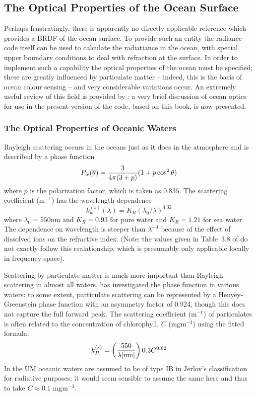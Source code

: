 \subsection{The Optical Properties of the Ocean Surface}

Perhaps frustratingly, there is apparently no directly applicable reference
which provides a BRDF of the ocean surface. To provide such an entity the
radiance code itself can be used to calculate the radiatiance in the
ocean, with special upper boundary conditions to deal with refraction at
the surface. In order to implement such a capability the optical properties
of the ocean must be specified; these are greatly influenced by particulate
matter -- indeed, this is the basis of ocean colour sensing -- and very
considerable variations occur. An extremely useful review of this
field is provided by \cite{Mobley94}: a very brief discussion of ocean
optics for use in the present version of the code,  based on this book, 
is now presented.

\subsubsection{The Optical Properties of Oceanic Waters}

Rayleigh scattering occurs in the oceans just as it does in the atmosphere
and is described by a phase function
\begin{equation}
P_w(\theta) = {3\over {4\pi (3+p)}} (1+p\cos^2 \theta)
\end{equation}
where $p$ is the polarization factor, which is taken as $0.835$. The scattering
coefficient (m${}^{-1}$) has the wavelength dependence
\begin{equation}
k_w^{(s)}(\lambda) = K_R (\lambda_0/\lambda)^{4.32}
\end{equation}
where $\lambda_0=550$nm and $K_R=0.93$ for pure water and $K_R=1.21$ for
sea water. The dependence on wavelength is steeper than $\lambda^{-4}$ 
because of the effect of dissolved ions on the refractive index. (Note: the
values given in Table~3.8 of \cite{Mobley94} do not exactly follow this
realationship, which is presumably only applicable locally in frequency
space). 

Scattering by particulate matter is much more important than Rayleigh
scattering in almost all waters. \cite{Petzold72} has investigated the
phase function in various waters: to some extent, particulate scattering
can be represented by a Henyey-Greenstein phase function with an asymmetry
factor of 0.924, though this does not capture the full forward peak. The
scattering coefficient (m${}^{-1}$) of particulates is often related to 
the concentration of chlorophyll, $C$ (mgm${}^{-3}$) using the fitted 
formula:
\begin{equation}
k_P^{(s)}= \left ( {{550} \over { \lambda \mbox{[nm]}}} \right ) 0.3 C^{0.62}
\end{equation}
In the UM oceanic waters are assumed to be of type IB in Jerlov's 
classification for radiative purposes; it would seem sensible to assume the
same here and thus to take $C \approx 0.1$ mgm${}^{-3}$.


